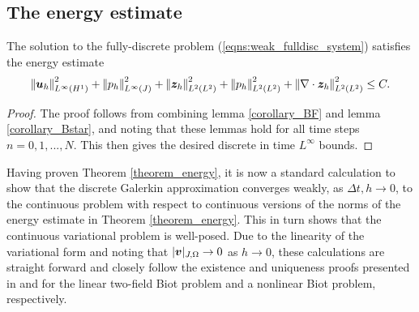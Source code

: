 \subsection{The energy estimate}
\label{sec:energy_estimate}

\begin{theorem}
\label{theorem_energy}
The solution to the fully-discrete problem (\ref{eqns:weak_fulldisc_system}) satisfies the energy estimate
\begin{equation*}
  {\left\vert\kern-0.25ex\left\vert \boldsymbol{u}_{h}\right\vert\kern-0.25ex\right\vert}_{L^{\infty}(H^{1})}^{2}+ {\left\vert\kern-0.25ex\left\vert p_h \right\vert\kern-0.25ex\right\vert}_{L^{\infty}(J)}^{2}+ {\left\vert\kern-0.25ex\left\vert \boldsymbol{z}_{h} \right\vert\kern-0.25ex\right\vert}_{L^{2}(L^{2})}^{2} +{\left\vert\kern-0.25ex\left\vert p_h \right\vert\kern-0.25ex\right\vert}_{L^{2}(L^{2})}^{2} +{\left\vert\kern-0.25ex\left\vert \nabla \cdot \boldsymbol{z}_{h} \right\vert\kern-0.25ex\right\vert}_{L^{2}(L^{2})}^{2} \leq C.
\end{equation*}
\end{theorem}
\begin{proof}
The proof follows from combining lemma \ref{corollary_BF} and lemma \ref{corollary_Bstar}, and noting that these lemmas hold for all time steps $n=0, 1,..., N$. This then gives the desired discrete in time $L^{\infty}$ bounds.
\end{proof}
\begin{rem}
\label{remark:wellposedness}
Having proven Theorem \ref{theorem_energy}, it is now a standard calculation to show that the discrete Galerkin approximation converges weakly, as $\Delta t, h \rightarrow 0$, to the continuous problem with respect to continuous versions of the norms of the energy estimate in Theorem \ref{theorem_energy}. This in turn shows that the continuous variational problem is well-posed. Due to the linearity of the variational form and noting that $|{\boldsymbol{v}}|_{J,\Omega} \rightarrow  0$ as $h \rightarrow 0$, these calculations are straight forward and closely follow the existence and uniqueness proofs presented in \cite{vzenivsek1984existence} and \cite{barucq2005some} for the linear two-field Biot problem and a nonlinear Biot problem, respectively.
\end{rem}

